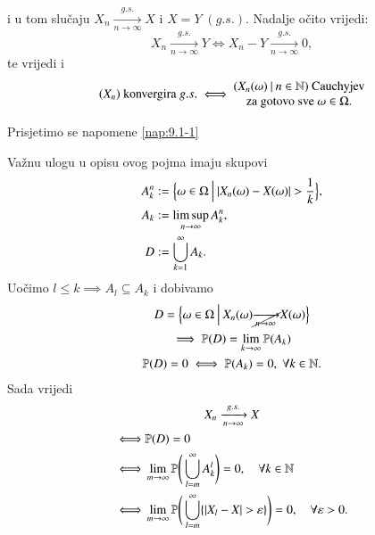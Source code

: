 i u tom slu\v caju $X_n \xrightarrow[n \to \infty]{g.s.} X$ i $X = Y \; (g.s.)$.
Nadalje o\v cito vrijedi:
\begin{equation}    \label{jed:11.3}
    X_n \xrightarrow[n \to \infty]{g.s.} Y \iff X_n - Y \xrightarrow[n \to \infty]{g.s.} 0,
\end{equation}
te vrijedi i
\begin{equation}    \label{jed:11.4}
    (X_n) \textnormal{ konvergira } g.s.
    \iff
    \begin{matrix}
        ({X_n(\omega)} \: | \: {n \in \mathbb{N}}) \textnormal{ Cauchyjev}\\
        \textnormal{za gotovo sve } \omega \in \Omega.
    \end{matrix}
\end{equation}

Prisjetimo se napomene \ref{nap:9.1-1}

Va\v znu ulogu u opisu ovog pojma imaju skupovi
\begin{equation*}
    \begin{aligned}
        A_k^n &:= \Big\{ {\omega \in \Omega} \: \Big| \: {|X_n(\omega) - X(\omega)| > \frac{1}{k}} \Big\},\\
        A_k &:= \limsup\limits_{n \to \infty} A_k^n,\\
        D &:= \bigcup\limits_{k = 1}^{\infty} A_k.
    \end{aligned}
\end{equation*}
Uo\v cimo $l \leq k \implies A_l \subseteq A_k$ i dobivamo
\begin{equation*}
    \begin{gathered}
        D = \Big\{ {\omega \in \Omega} \: \Big| \: {X_n(\omega) \cancel{\xrightarrow[n \to \infty]{}}X(\omega)} \Big\}\\
        \implies  \mathbb{P}({D}) = \lim\limits_{k \to \infty} \mathbb{P}({A_k})\\
        \mathbb{P}({D}) = 0 \iff \mathbb{P}({A_k}) = 0, \; \forall k \in \mathbb{N}.
    \end{gathered}
\end{equation*}
Sada vrijedi
\begin{equation}    \label{jed:11.5}
    \begin{gathered}
        X_n \xrightarrow[n \to \infty]{g.s.} X\\
        \begin{aligned}
            \iff &\mathbb{P}({D}) = 0\\
            \iff &\lim\limits_{m \to \infty} \mathbb{P} \Bigg( \bigcup\limits_{l = m}^{\infty} A_k^l \Bigg) = 0, \quad \forall k \in \mathbb{N}\\
            \iff &\lim\limits_{m \to \infty} \mathbb{P} \Bigg( \bigcup\limits_{l = m}^{\infty} \{ |X_l - X| > \varepsilon \} \Bigg) = 0, \quad \forall \varepsilon > 0.
        \end{aligned}
    \end{gathered}
\end{equation}


